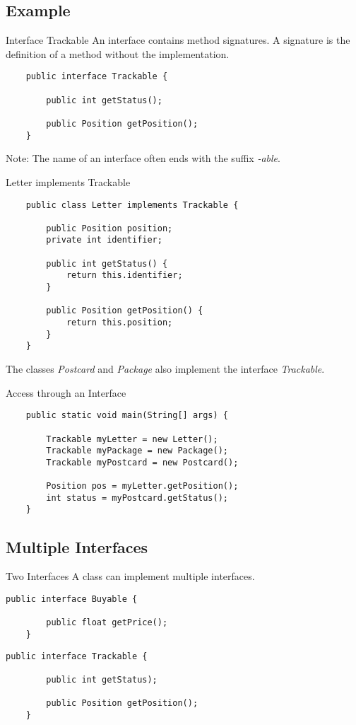 \subsection{Example}
\begin{frame}[fragile]{Interface Trackable}
    An interface contains method signatures. A signature is the definition of a method without the implementation.
    \begin{lstlisting}
    public interface Trackable {
    
        public int getStatus();
        
        public Position getPosition();
    }\end{lstlisting}
    Note: The name of an interface often ends with the suffix \emph{-able}.
\end{frame}
\begin{frame}[fragile]{Letter implements Trackable}
    \begin{lstlisting}
    public class Letter implements Trackable {
    
        public Position position;
        private int identifier;
    
        public int getStatus() {
            return this.identifier;
        }
        
        public Position getPosition() {
            return this.position;
        }
    }\end{lstlisting}
    The classes \emph{Postcard} and \emph{Package} also implement the interface \emph{Trackable}.
\end{frame}

\begin{frame}[fragile]{Access through an Interface}
    \begin{lstlisting}
    public static void main(String[] args) {
    
        Trackable myLetter = new Letter();
        Trackable myPackage = new Package();
        Trackable myPostcard = new Postcard();
        
        Position pos = myLetter.getPosition();
        int status = myPostcard.getStatus();
    }\end{lstlisting}
\end{frame}

\subsection{Multiple Interfaces}
\begin{frame}[fragile]{Two Interfaces}
    A class can implement multiple interfaces.
    \vfill
    \begin{lstlisting}[basicstyle=\ttfamily\scriptsize]
    public interface Buyable {
    
        public float getPrice();
    }\end{lstlisting}
    \begin{lstlisting}[basicstyle=\ttfamily\scriptsize]
    public interface Trackable {
    
        public int getStatus);
        
        public Position getPosition();
    }\end{lstlisting}
\end{frame}


